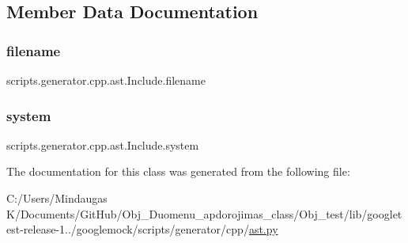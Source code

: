 \subsection{Member Data Documentation}
\mbox{\label{classscripts_1_1generator_1_1cpp_1_1ast_1_1_include_a48e9d7ce08bb32c4fa38e3baab527c01}} 
\subsubsection{\texorpdfstring{filename}{filename}}
{\footnotesize\ttfamily scripts.\+generator.\+cpp.\+ast.\+Include.\+filename}

\mbox{\label{classscripts_1_1generator_1_1cpp_1_1ast_1_1_include_a709a17ef8542e60f574db44050514ac8}} 
\subsubsection{\texorpdfstring{system}{system}}
{\footnotesize\ttfamily scripts.\+generator.\+cpp.\+ast.\+Include.\+system}



The documentation for this class was generated from the following file\+:\begin{DoxyCompactItemize}
\item 
C\+:/\+Users/\+Mindaugas K/\+Documents/\+Git\+Hub/\+Obj\+\_\+\+Duomenu\+\_\+apdorojimas\+\_\+class/\+Obj\+\_\+test/lib/googletest-\/release-\/1../googlemock/scripts/generator/cpp/\mbox{\hyperlink{_obj__test_2lib_2googletest-release-1_88_81_2googlemock_2scripts_2generator_2cpp_2ast_8py}{ast.\+py}}\end{DoxyCompactItemize}
